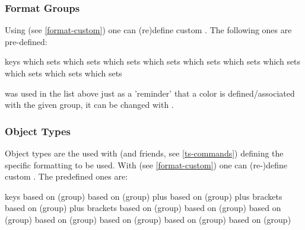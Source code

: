 \documentclass{article}
\begin{document}

\subsubsection{Format Groups}\label{format-group}
Using  (see \ref{format-custom}) one can (re)define custom . The following ones are pre-defined:
\begin{describelist*}{keys}
   {which sets }
   {which sets }
   {which sets }
   {which sets }
   {which sets }
   {which sets }
   {which sets }
   {which sets }
    {which sets }
    {which sets }
\end{describelist*}
\begin{tsremark}
 was used in the list above just as a 'reminder' that a color is defined/associated with the given group, it can be changed with .
\end{tsremark}

\subsubsection{Object Types}\label{obj-types}
Object types are the  used with \tsobj{\tsobj} (and friends, see \ref{ts-commands}) defining the specific formatting to be used.
With  (see \ref{format-custom}) one can (re-)define custom . 
The predefined ones are:

\begin{describelist*}{keys}
   {based on (group) }
   {based on (group)  plus }
   {based on (group)  plus brackets}
   {based on (group)  plus brackets}
   {based on (group) }
   {based on (group) }
   {based on (group) }
   {based on (group) }
   {based on (group) }
    {based on (group) }
    {based on (group) }
\end{describelist*}
\end{document}
